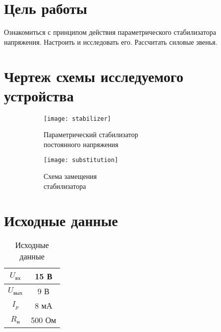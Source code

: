 





\section{Цель работы}

Ознакомиться с принципом действия параметрического стабилизатора напряжения. Настроить и исследовать его. Рассчитать силовые звенья.

\section{Чертеж схемы исследуемого устройства}

\begin{figure}[H]
\begin{center}
	\begin{subfigure}[b]{0.45\textwidth}
		\texttt{[image: stabilizer]}
		\caption{Параметрический стабилизатор\\ постоянного напряжения}
	\end{subfigure}
	\begin{subfigure}[b]{0.45\textwidth}
		\texttt{[image: substitution]}
		\caption{Схема замещения \\стабилизатора}
	\end{subfigure}
	\caption{}
\end{center}
\end{figure}

\vspace{-0.5cm}

\section{Исходные данные}

\begin{table}[H]
\begin{center}
	\caption{Исходные данные}
	\def\tabcolsep{36pt}
	\begin{tabular}{|c|c|}
		\hline 
		$U_\text{вх}$ & 15 В \\ 
		\hline 
		$U_\text{вых}$ & 9 В \\ 
		\hline 
		$I_p$ & 8 мА \\ 
		\hline 
		$R_\text{н}$ & 500 Ом \\ 
		\hline 
	\end{tabular} 
\end{center}
\end{table}

